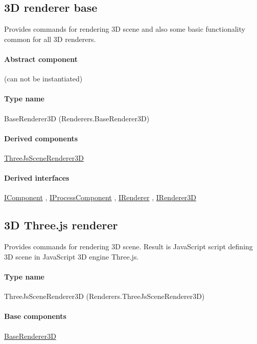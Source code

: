 
\subsection{3D renderer base}
\label{Malsys.Processing.Components.Renderers.BaseRenderer3D}
Provides commands for rendering 3D scene and also
            some basic functionality common for all 3D renderers.	\paragraph{Abstract component} (can not be instantiated)
\paragraph{Type name}
BaseRenderer3D (Renderers.BaseRenderer3D) 	\paragraph{Derived components}
		\hyperref[Malsys.Processing.Components.Renderers.ThreeJsSceneRenderer3D]{ThreeJsSceneRenderer3D}%
	\paragraph{Derived interfaces}
		\hyperref[Malsys.Processing.Components.IComponent]{IComponent}%
, 		\hyperref[Malsys.Processing.Components.IProcessComponent]{IProcessComponent}%
, 		\hyperref[Malsys.Processing.Components.IRenderer]{IRenderer}%
, 		\hyperref[Malsys.Processing.Components.Renderers.IRenderer3D]{IRenderer3D}%
	

\subsection{3D Three.js renderer}
\label{Malsys.Processing.Components.Renderers.ThreeJsSceneRenderer3D}
Provides commands for rendering 3D scene.
            Result is JavaScript script defining 3D scene in JavaScript 3D engine Three.js.\paragraph{Type name}
ThreeJsSceneRenderer3D (Renderers.ThreeJsSceneRenderer3D) 	\paragraph{Base components}
		\hyperref[Malsys.Processing.Components.Renderers.BaseRenderer3D]{BaseRenderer3D}%
